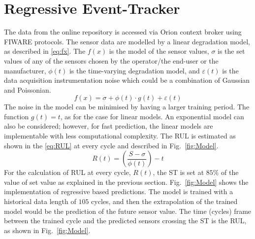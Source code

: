 \documentclass[conference]{IEEEtran}
\begin{document}
\section{Regressive Event-Tracker}
\label{sec:RET}
The data from the online repository is accessed via Orion context broker using FIWARE protocols. The sensor data are modelled by a linear degradation model, as described in \eqref{eq:fx}. The $f(x)$ is the model of the sensor values, $\sigma$ is the set values of any of the sensors chosen by the operator/the end-user or the manufacturer, $\phi(t)$ is the time-varying degradation model, and $\varepsilon(t)$ is the data acquisition instrumentation noise which could be a combination of Gaussian and Poissonian.
\begin{equation}
    f(x) = \sigma + \phi(t)\cdot g(t) + \varepsilon(t)
    \label{eq:fx}
\end{equation}
The noise in the model can be minimised by having a larger training period. The function $g(t)=t$, as for the case for linear models. An exponential model can also be considered; however, for fast prediction, the linear models are implementable with less computational complexity. The RUL is estimated as shown in the \eqref{eq:RUL} at every cycle and described in Fig.~\ref{fig:Model}.
\begin{equation}
    R(t) = \left(\frac{S-\sigma}{\phi(t)}\right)-t
    \label{eq:RUL}
\end{equation}
For the calculation of RUL at every cycle, $R(t)$, the ST is set at $85\%$ of the value of set value as explained in the previous section. Fig.~\ref{fig:Model} shows the implementation of regressive based predictions. The model is trained with a historical data length of $105$ cycles, and then the extrapolation of the trained model would be the prediction of the future sensor value. The time (cycles) frame between the trained cycle and the predicted sensors crossing the ST is the RUL, as shown in Fig.~\ref{fig:Model}.
\end{document}

